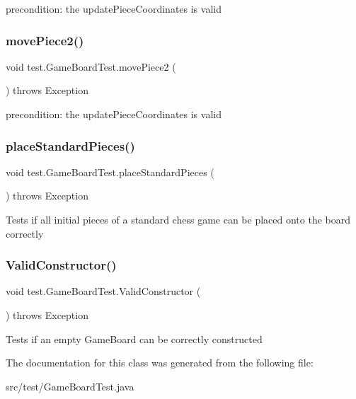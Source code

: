 precondition\+: the update\+Piece\+Coordinates is valid \mbox{\label{classtest_1_1_game_board_test_acac01404dbfc189519f2e21f4105d7e2}} 
\subsubsection{\texorpdfstring{move\+Piece2()}{movePiece2()}}
{\footnotesize\ttfamily void test.\+Game\+Board\+Test.\+move\+Piece2 (\begin{DoxyParamCaption}{ }\end{DoxyParamCaption}) throws Exception}

precondition\+: the update\+Piece\+Coordinates is valid \mbox{\label{classtest_1_1_game_board_test_ae0458820f080e86163d12ff75d019f9a}} 
\subsubsection{\texorpdfstring{place\+Standard\+Pieces()}{placeStandardPieces()}}
{\footnotesize\ttfamily void test.\+Game\+Board\+Test.\+place\+Standard\+Pieces (\begin{DoxyParamCaption}{ }\end{DoxyParamCaption}) throws Exception}

Tests if all initial pieces of a standard chess game can be placed onto the board correctly \mbox{\label{classtest_1_1_game_board_test_a45e7ff57d223c2ebb209cc35f8b0d916}} 
\subsubsection{\texorpdfstring{Valid\+Constructor()}{ValidConstructor()}}
{\footnotesize\ttfamily void test.\+Game\+Board\+Test.\+Valid\+Constructor (\begin{DoxyParamCaption}{ }\end{DoxyParamCaption}) throws Exception}

Tests if an empty Game\+Board can be correctly constructed 

The documentation for this class was generated from the following file\+:\begin{DoxyCompactItemize}
\item 
src/test/Game\+Board\+Test.\+java\end{DoxyCompactItemize}
